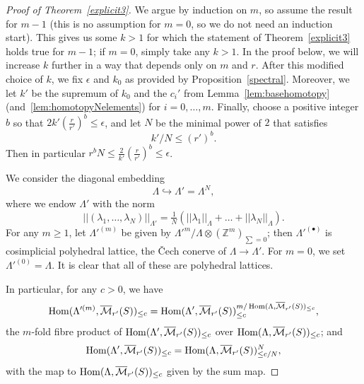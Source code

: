 \begin{proof}[Proof of Theorem~\ref{explicit3}] We argue by induction on $m$, so assume the result for $m-1$ (this is no assumption for $m=0$, so we do not need an induction start). This gives us some $k>1$ for which the statement of Theorem~\ref{explicit3} holds true for $m-1$; if $m=0$, simply take any $k>1$. In the proof below, we will increase $k$ further in a way that depends only on $m$ and $r$. After this modified choice of $k$, we fix $\epsilon$ and $k_0$ as provided by Proposition~\ref{spectral}. Moreover, we let $k'$ be the supremum of $k_0$ and the $c_i'$ from Lemma~\ref{lem:basehomotopy} (and~\ref{lem:homotopyNelements}) for $i=0,\ldots,m$. Finally, choose a positive integer $b$ so that $2k'(\tfrac r{r'})^b\leq \epsilon$, and let $N$ be the minimal power of $2$ that satisfies
\[
k'/N\leq (r')^b.
\]
Then in particular $r^bN\leq \frac 2{k'}(\tfrac{r}{r'})^b\leq \epsilon$.

We consider the diagonal embedding
\[
\Lambda\hookrightarrow \Lambda' = \Lambda^N,
\]
where we endow $\Lambda'$ with the norm
\[
||(\lambda_1,\ldots,\lambda_N)||_{\Lambda'} = \tfrac 1N(||\lambda_1||_\Lambda+\ldots+||\lambda_N||_\Lambda).
\]
For any $m\geq 1$, let $\Lambda'^{(m)}$ be given by $\Lambda'^m / \Lambda\otimes (\mathbb Z^m)_{\sum=0}$; then $\Lambda'^{(\bullet)}$ is cosimplicial polyhedral lattice, the \v{C}ech conerve of $\Lambda\to \Lambda'$. For $m=0$, we set $\Lambda'^{(0)} = \Lambda$. It is clear that all of these are polyhedral lattices.

In particular, for any $c>0$, we have
\[
\operatorname{Hom}(\Lambda'^{(m)},\overline{\mathcal M}_{r'}(S))_{\leq c} = \operatorname{Hom}(\Lambda',\overline{\mathcal M}_{r'}(S))_{\leq c}^{m/\operatorname{Hom}(\Lambda,\overline{\mathcal M}_{r'}(S))_{\leq c}},
\]
the $m$-fold fibre product of $\operatorname{Hom}(\Lambda',\overline{\mathcal M}_{r'}(S))_{\leq c}$ over $\operatorname{Hom}(\Lambda,\overline{\mathcal M}_{r'}(S))_{\leq c}$; and
\[
\operatorname{Hom}(\Lambda',\overline{\mathcal M}_{r'}(S))_{\leq c} = \operatorname{Hom}(\Lambda,\overline{\mathcal M}_{r'}(S))_{\leq c/N}^N,
\]
with the map to $\operatorname{Hom}(\Lambda,\overline{\mathcal M}_{r'}(S))_{\leq c}$ given by the sum map.


\end{proof}

